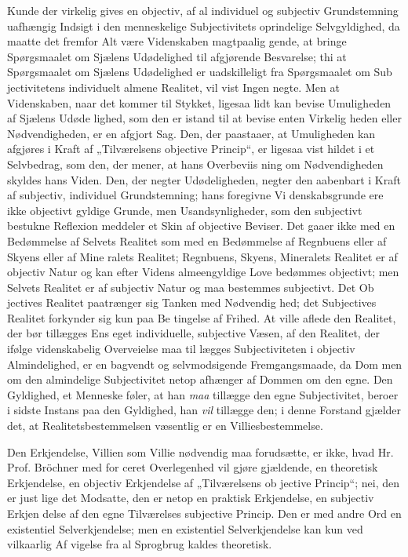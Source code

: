 \documentclass[12pt]{book}
\newcommand{\opage}[1]{\marginnote{\footnotesize\textit{[#1]}}}
\begin{document}
Kunde der virkelig gives en objectiv, af al individuel
og subjectiv Grundstemning uafhængig Indsigt i den
menneskelige Subjectivitets oprindelige Selvgyldighed, da
maatte det fremfor Alt være Videnskaben magtpaalig\-%
gende, at bringe Spørgsmaalet om Sjælens Udødelighed
til afgjørende Besvarelse; thi at Spørgsmaalet om Sjælens
Udødelighed er uadskilleligt fra Spørgsmaalet om Sub\-%
jectivitetens individuelt almene Realitet, vil vist Ingen
negte. Men at Videnskaben, naar det kommer til Stykket,
ligesaa lidt kan bevise Umuligheden af Sjælens Udøde\-%
lighed, som den er istand til at bevise enten Virkelig\-%
heden eller Nødvendigheden, er en afgjort Sag. Den,
der paastaaer, at Umuligheden kan afgjøres i Kraft af
„Tilværelsens objective Princip“, er ligesaa vist hildet i
et Selvbedrag, som den, der mener, at hans Overbeviis\-%
ning om Nødvendigheden skyldes hans Viden. Den, der
negter Udødeligheden, negter den aabenbart i Kraft af
\opage{16}\setcounter{footnote}{0}%
subjectiv, individuel Grundstemning; hans foregivne Vi\-%
denskabsgrunde ere ikke objectivt gyldige Grunde, men
Usandsynligheder, som den subjectivt bestukne Reflexion
meddeler et Skin af objective Beviser. Det gaaer ikke
med en Bedømmelse af Selvets Realitet som med en
Bedømmelse af Regnbuens eller af Skyens eller af Mine\-%
ralets Realitet; Regnbuens, Skyens, Mineralets Realitet
er af objectiv Natur og kan efter Videns almeengyldige
Love bedømmes objectivt; men Selvets Realitet er af
subjectiv Natur og maa bestemmes subjectivt. Det Ob\-%
jectives Realitet paatrænger sig Tanken med Nødvendig\-%
hed; det Subjectives Realitet forkynder sig kun paa Be\-%
tingelse af Frihed. At ville aflede den Realitet, der bør
tillægges Ens eget individuelle, subjective Væsen, af den
Realitet, der ifølge videnskabelig Overveielse maa til\-%
lægges Subjectiviteten i objectiv Almindelighed, er en
bagvendt og selvmodsigende Fremgangsmaade, da Dom\-%
men om den almindelige Subjectivitet netop afhænger af
Dommen om den egne. Den Gyldighed, et Menneske
føler, at han \emph{maa} tillægge den egne Subjectivitet, beroer
i sidste Instans paa den Gyldighed, han \emph{vil} tillægge den;
i denne Forstand gjælder det, at Realitetsbestemmelsen
væsentlig er en Villiesbestemmelse.

Den Erkjendelse, Villien som Villie nødvendig maa
forudsætte, er ikke, hvad Hr. Prof. Bröchner med for\-%
ceret Overlegenhed vil gjøre gjældende, en theoretisk
Erkjendelse, en objectiv Erkjendelse af „Tilværelsens ob\-%
jective Princip“; nei, den er just lige det Modsatte, den
er netop en praktisk Erkjendelse, en subjectiv Erkjen\-%
delse af den egne Tilværelses subjective Princip. Den
er med andre Ord en existentiel Selverkjendelse; men
en existentiel Selverkjendelse kan kun ved vilkaarlig Af\-%
vigelse fra al Sprogbrug kaldes theoretisk.
\end{document}
